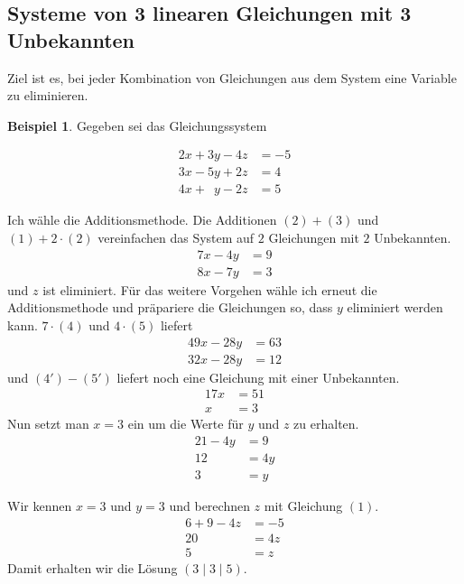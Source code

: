 \documentclass[%
11pt,%
twoside,%
titlepage,%
swissgerman,%
headsepline%
]{scrartcl}
\theoremstyle{definition}
\newtheorem{bsp}{Beispiel}[subsection] %
\theoremstyle{plain}
\begin{document}
	\subsection{Systeme von 3 linearen Gleichungen mit 3 Unbekannten}
	
	Ziel ist es, bei jeder Kombination von Gleichungen aus dem System eine Variable zu eliminieren.
	\begin{bsp}
		
		Gegeben sei das Gleichungssystem
		
		\begin{align}
			2x+3y-4z&=-5\tag{1}\\
			3x-5y+2z&=4\tag{2}\\
			4x+\phantom{1}y-2z&=5\tag{3}
		\end{align}
		
		Ich wähle die Additionsmethode. Die Additionen $(2)+(3)$ und $(1)+2\cdot(2)$ vereinfachen das System auf $2$ Gleichungen mit $2$ Unbekannten.
		\begin{align}
			7x-4y&=9\tag{4}\\
			8x-7y&=3\tag{5}
		\end{align}
		und $z$ ist eliminiert. Für das weitere Vorgehen wähle ich erneut die Additionsmethode und präpariere die Gleichungen so, dass $y$ eliminiert werden kann. $7\cdot(4)$ und $4\cdot(5)$ liefert
		\begin{align}
			49x-28y&=63\tag{4'}\\
			32x-28y&=12\tag{5'}
		\end{align}
		und $(4')-(5')$ liefert noch eine Gleichung mit einer Unbekannten.
		\begin{align}
			17x&=51\tag{$\div17$}\\
			x&=3\tag{6}
		\end{align}
		Nun setzt man $x=3$ ein um die Werte für $y$ und $z$ zu erhalten.
		\begin{align}
			21-4y&=9\tag{6) in (4}\\
			12&=4y\tag{$\div4$}\\
			3&=y\tag{7}
		\end{align}
		
		Wir kennen $x=3$ und $y=3$ und berechnen $z$ mit Gleichung $(1)$.
		\begin{align}
			6+9-4z&=-5\tag{6) und (7) in (1}\\
			20&=4z\tag{$\div4$}\\
			5&=z\tag{8}
		\end{align}
		Damit erhalten wir die Lösung $(3\mid 3\mid 5)$.
	\end{bsp}
	
\end{document}
